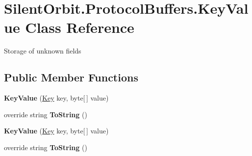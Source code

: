 \hypertarget{class_silent_orbit_1_1_protocol_buffers_1_1_key_value}{}\section{Silent\+Orbit.\+Protocol\+Buffers.\+Key\+Value Class Reference}
\label{class_silent_orbit_1_1_protocol_buffers_1_1_key_value}


Storage of unknown fields  


\subsection*{Public Member Functions}
\begin{DoxyCompactItemize}
\item 
{\bfseries Key\+Value} (\hyperlink{class_silent_orbit_1_1_protocol_buffers_1_1_key}{Key} key, byte\mbox{[}$\,$\mbox{]} value)\hypertarget{class_silent_orbit_1_1_protocol_buffers_1_1_key_value_a0c2f85ee43da09988ea6ce9f265ad471}{}\label{class_silent_orbit_1_1_protocol_buffers_1_1_key_value_a0c2f85ee43da09988ea6ce9f265ad471}

\item 
override string {\bfseries To\+String} ()\hypertarget{class_silent_orbit_1_1_protocol_buffers_1_1_key_value_a659b764ee7159314181fc2f57547b59c}{}\label{class_silent_orbit_1_1_protocol_buffers_1_1_key_value_a659b764ee7159314181fc2f57547b59c}

\item 
{\bfseries Key\+Value} (\hyperlink{class_silent_orbit_1_1_protocol_buffers_1_1_key}{Key} key, byte\mbox{[}$\,$\mbox{]} value)\hypertarget{class_silent_orbit_1_1_protocol_buffers_1_1_key_value_a0c2f85ee43da09988ea6ce9f265ad471}{}\label{class_silent_orbit_1_1_protocol_buffers_1_1_key_value_a0c2f85ee43da09988ea6ce9f265ad471}

\item 
override string {\bfseries To\+String} ()\hypertarget{class_silent_orbit_1_1_protocol_buffers_1_1_key_value_a659b764ee7159314181fc2f57547b59c}{}\label{class_silent_orbit_1_1_protocol_buffers_1_1_key_value_a659b764ee7159314181fc2f57547b59c}

\end{DoxyCompactItemize}

